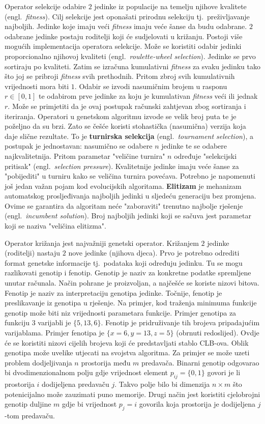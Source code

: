 \documentclass[times, utf8, diplomski]{fer}
\begin{document}
Operator selekcije odabire $2$ jedinke iz populacije na temelju njihove kvalitete (engl.~\textit{fitness}). Cilj selekcije jest oponašati prirodnu selekciju tj.~preživljavanje najboljih. Jedinke koje imaju veći \textit{fitness} imaju veće šanse da budu odabrane. $2$ odabrane jedinke postaju roditelji koji će sudjelovati u križanju. Postoji više mogućih implementacija operatora selekcije. Može se koristiti odabir jedinki proporcionalno njihovoj kvaliteti (engl.~\textit{roulette-wheel selection}). Jedinke se prvo sortiraju po kvaliteti. Zatim se izračuna kumulativni \textit{fitness} za svaku jedinku tako što joj se pribroji \textit{fitness} svih prethodnih. Pritom zbroj svih kumulativnih vrijednosti mora biti $1$. Odabir se izvodi nasumičnim brojem u rasponu $r \in [0, 1]$ te odabirom prve jedinke za koju je kumulativan \textit{fitness} veći ili jednak $r$. Može se primjetiti da je ovaj postupak računski zahtjevan zbog sortiranja i iteriranja. Operatori u genetskom algoritmu izvode se velik broj puta te je poželjno da su brzi. Zato se češće koristi stohastička (nasumična) verzija koja daje slične rezultate. To je \textbf{turnirska selekcija} (engl.~\textit{tournament selection}), a postupak je jednostavan: nasumično se odabere $n$ jedinke te se odabere najkvalitetnija. Pritom parametar "veličine turnira" $n$ određuje "selekcijski pritisak" (engl.~\textit{selection pressure}).  Kvalitetnije jedinke imaju veće šanse za "pobijediti" u turniru kako se veličina turnira povećava. Potrebno je napomenuti još jedan važan pojam kod evolucijskih algoritama. \textbf{Elitizam} je mehanizam automatskog prosljeđivanja najboljih jedinki u sljedeću generaciju bez promjena. Ovime se garantira da algoritam neće "zaboraviti" trenutno najbolje rješenje (engl.~\textit{incumbent solution}). Broj najboljih jedinki koji se sačuva jest parametar koji se naziva "veličina elitizma".

Operator križanja jest najvažniji genetski operator. Križanjem $2$ jedinke (roditelji) nastaju $2$ nove jedinke (njihova djeca). Prvo je potrebno odrediti format genetske informacije tj.~podataka koji određuju jedinku. Tu se mogu razlikovati genotip i fenotip. Genotip je naziv za konkretne podatke spremljene unutar računala. Način pohrane je proizvoljan, a najčešće se koriste nizovi bitova. Fenotip je naziv za interpretaciju genotipa jedinke. Točnije, fenotip je preslikavanje iz genotipa u rješenje. Na primjer, kod traženja minimuma funkcije genotip može biti niz vrijednosti parametara funkcije. Primjer genotipa za funkciju $3$ varijabli je $\{5, 13, 6\}$. Fenotip je pridruživanje tih brojeva pripadajućim varijablama. Primjer fenotipa je $\{x=6, y=13, z=5\}$ (obrnuti redoslijed). Ovdje će se koristiti nizovi cijelih brojeva koji će predstavljati stablo CLB-ova. Oblik genotipa može uvelike utjecati na svojstva algoritma. Za primjer se može uzeti problem dodjeljivanja $n$ prostorija među $m$ predavača. Binarni genotip odgovarao bi dvodimenzionalnom polju gdje vrijednost element $p_{ij}=\{0, 1\}$ govori je li prostorija $i$ dodijeljena predavaču $j$. Takvo polje bilo bi dimenzija $n \times m$ što potenicijalno može zauzimati puno memorije. Drugi način jest koristiti cjelobrojni genotip duljine $m$ gdje bi vrijednost $p_{j}=i$ govorila koja prostorija je dodijeljena $j$-tom predavaču.
\end{document}

